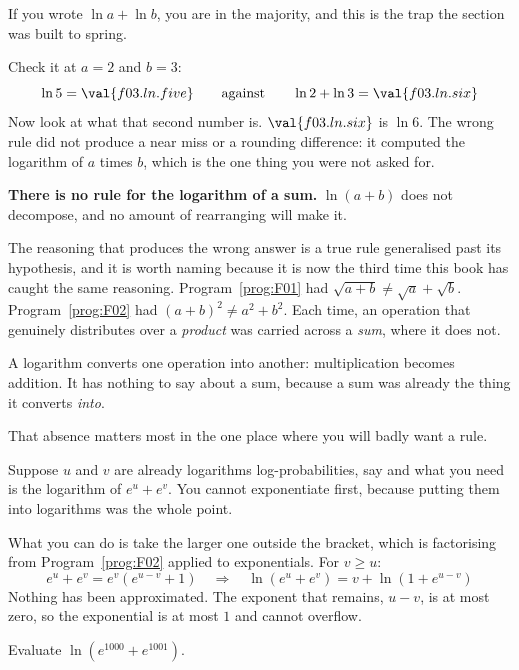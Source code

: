 \begin{fr}
\begin{ansblock}
If you wrote $\ln a + \ln b$, you are in the majority, and this is the trap the
section was built to spring.

Check it at $a = 2$ and $b = 3$:
\[ \ln 5 = \val{f03.ln.five} \qquad \text{against} \qquad
   \ln 2 + \ln 3 = \val{f03.ln.six} \]
Now look at what that second number is. $\val{f03.ln.six}$ is $\ln 6$. The
wrong rule did not produce a near miss or a rounding difference: it computed
the logarithm of $a$ times $b$, which is the one thing you were not asked for.
\end{ansblock}

\begin{trapbox}
\textbf{There is no rule for the logarithm of a sum.} $\ln(a+b)$ does not
decompose, and no amount of rearranging will make it.

The reasoning that produces the wrong answer is a true rule generalised past
its hypothesis, and it is worth naming because it is now the third time this
book has caught the same reasoning. Program~\ref{prog:F01} had
$\sqrt{a+b} \ne \sqrt{a} + \sqrt{b}$. Program~\ref{prog:F02} had
$(a+b)^{2} \ne a^{2} + b^{2}$. Each time, an operation that genuinely
distributes over a \emph{product} was carried across a \emph{sum}, where it
does not.

A logarithm converts one operation into another: multiplication becomes
addition. It has nothing to say about a sum, because a sum was already the
thing it converts \emph{into}.
\end{trapbox}
\end{fr}

\begin{fr}
That absence matters most in the one place where you will badly want a rule.

Suppose $u$ and $v$ are already logarithms \dash{} log-probabilities, say
\dash{} and what you need is the logarithm of $e^{u} + e^{v}$. You cannot
exponentiate first, because putting them into logarithms was the whole point.

What you can do is take the larger one outside the bracket, which is factorising
from Program~\ref{prog:F02} applied to exponentials. For $v \ge u$:
\[ e^{u} + e^{v} = e^{v}\left(e^{u-v} + 1\right)
   \quad\Longrightarrow\quad
   \ln\!\left(e^{u} + e^{v}\right) = v + \ln\!\left(1 + e^{u-v}\right) \]
Nothing has been approximated. The exponent that remains, $u - v$, is at most
zero, so the exponential is at most $1$ and cannot overflow.

Evaluate $\ln\!\left(e^{1000} + e^{1001}\right)$.
\nextframe
\end{fr}

